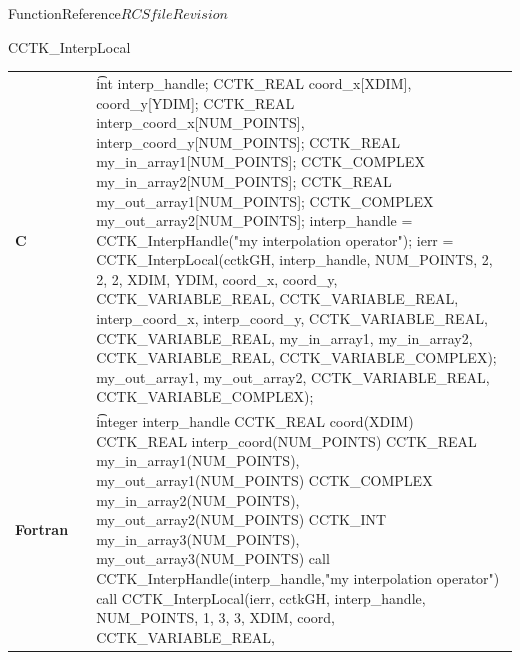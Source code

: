 \begin{cactuspart}{FunctionReference}{$RCSfile$}{$Revision$}
\begin{CCTKFunc}{CCTK\_InterpLocal}
\begin{params}
\end{params}
\begin{discussion}
\end{discussion}
\begin{examples}
\begin{tabular}{@{}p{3cm}cp{11cm}}
\hfill {\bf C} && {\t
int interp\_handle;
CCTK\_REAL coord\_x[XDIM], coord\_y[YDIM];
CCTK\_REAL interp\_coord\_x[NUM\_POINTS], interp\_coord\_y[NUM\_POINTS];
CCTK\_REAL my\_in\_array1[NUM\_POINTS];
CCTK\_COMPLEX  my\_in\_array2[NUM\_POINTS];
CCTK\_REAL my\_out\_array1[NUM\_POINTS];
CCTK\_COMPLEX  my\_out\_array2[NUM\_POINTS];\linebreak
interp\_handle =\vfill
\hspace{2ex} CCTK\_InterpHandle("my interpolation operator");
ierr = CCTK\_InterpLocal(cctkGH,\vfill
\hspace{2ex} interp\_handle, NUM\_POINTS, 2, 2, 2,\vfill
\hspace{2ex} XDIM, YDIM, coord\_x, coord\_y,\vfill
\hspace{2ex} CCTK\_VARIABLE\_REAL, CCTK\_VARIABLE\_REAL,\vfill
\hspace{2ex} interp\_coord\_x, interp\_coord\_y,\vfill
\hspace{2ex} CCTK\_VARIABLE\_REAL, CCTK\_VARIABLE\_REAL,\vfill
\hspace{2ex} my\_in\_array1, my\_in\_array2,\vfill
\hspace{2ex} CCTK\_VARIABLE\_REAL, CCTK\_VARIABLE\_COMPLEX);
\hspace{2ex} my\_out\_array1, my\_out\_array2,\vfill
\hspace{2ex} CCTK\_VARIABLE\_REAL, CCTK\_VARIABLE\_COMPLEX);
}
\\
\hfill {\bf Fortran} && {\t
integer interp\_handle
CCTK\_REAL coord(XDIM)
CCTK\_REAL interp\_coord(NUM\_POINTS)
CCTK\_REAL my\_in\_array1(NUM\_POINTS), my\_out\_array1(NUM\_POINTS)
CCTK\_COMPLEX my\_in\_array2(NUM\_POINTS), my\_out\_array2(NUM\_POINTS)
CCTK\_INT my\_in\_array3(NUM\_POINTS), my\_out\_array3(NUM\_POINTS)\linebreak
call CCTK\_InterpHandle(interp\_handle,\vfill\hspace{2ex}"my interpolation operator")
call CCTK\_InterpLocal(ierr, cctkGH,\vfill
\hspace{2ex} interp\_handle, NUM\_POINTS, 1, 3, 3,\vfill
\hspace{2ex} XDIM, coord,\vfill
\hspace{2ex} CCTK\_VARIABLE\_REAL,\vfill
}
\end{tabular}
\end{examples}
\end{CCTKFunc}
\end{cactuspart}
